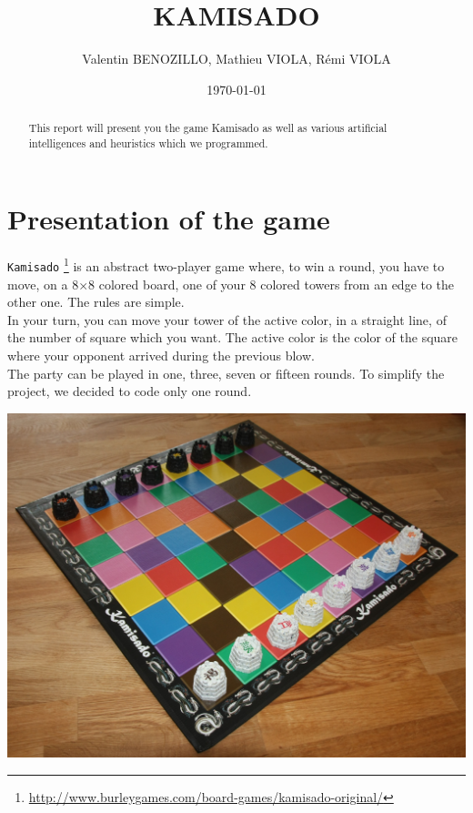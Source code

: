 \documentclass[a4paper, 11pt]{article}
\title{KAMISADO}
\author{Valentin BENOZILLO, Mathieu VIOLA, Rémi VIOLA}
\date{\today}
\begin{document}
\maketitle

\begin{abstract}
This report will present you the game Kamisado as well as various artificial intelligences and heuristics which we programmed.
\end{abstract}

\newpage

\tableofcontents

\newpage

\section{Presentation of the game}
\verb?Kamisado? \footnote{\url{http://www.burleygames.com/board-games/kamisado-original/}} is an abstract two-player game where, to win a round, you have to move, on a 8$\times$8 colored board, one of your 8 colored towers from an edge to the other one. The rules are simple.\\
In your turn, you can move your tower of the active color, in a straight line, of the number of square which you want. The active color is the color of the square where your opponent arrived during the previous blow.\\
The party can be played in one, three, seven or fifteen rounds. To simplify the project, we decided to code only one round.
\begin{center}
\includegraphics[scale = 0.09]{kamisado.jpeg}
\end{center}
\end{document}

